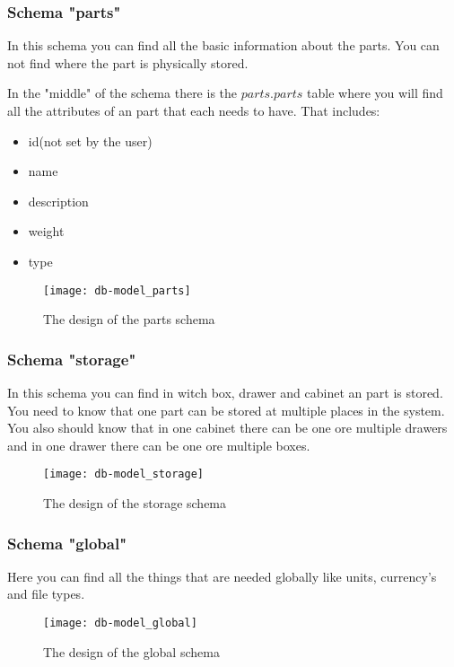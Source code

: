 \newpage
\subsubsection{Schema "parts"}
In this schema you can find all the basic information about the parts. You can not find where the part is physically stored.

In the "middle" of the schema there is the $parts.parts$ table where you will find all the attributes of an part that each needs to have. That includes:
\begin{itemize}
	\item id(not set by the user)
	\item name
	\item description
	\item weight
	\item type
\end{itemize}

\begin{figure}
\texttt{[image: db-model\_parts]}
\centering
\caption{The design of the parts schema}
\end{figure}

\newpage
\subsubsection{Schema "storage"}
In this schema you can find in witch box, drawer and cabinet an part is stored. You need to know that one part can be stored at multiple places in the system. You also should know that in one cabinet there can be one ore multiple drawers and in one drawer there can be one ore multiple boxes.

\begin{figure}
	\texttt{[image: db-model\_storage]}
	\centering
	\caption{The design of the storage schema}
\end{figure}

\newpage
\subsubsection{Schema "global"}
Here you can find all the things that are needed globally like units, currency's and file types.

\begin{figure}[h]
	\texttt{[image: db-model\_global]}
	\centering
	\caption{The design of the global schema}
\end{figure}

